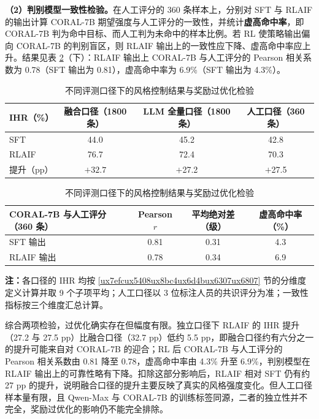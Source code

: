 \documentclass[fontset=fandol,type=master,campus=shenzhen,etitleauto=true]{hithesisbook}
\begin{document}
\textbf{（2）判别模型一致性检验。}在人工评分的 360 条样本上，分别对 SFT 与 RLAIF 的输出计算 CORAL-7B 期望强度与人工评分的一致性，并统计\textbf{虚高命中率}，即 CORAL-7B 判为命中目标、而人工判为未命中的样本比例。若 RL 使策略输出偏向 CORAL-7B 的判别盲区，则 RLAIF 输出上的一致性应下降、虚高命中率应上升。结果见表 \ref{tab:rm-overopt}（下）：RLAIF 输出上 CORAL-7B 与人工评分的 Pearson 相关系数为 0.78（SFT 输出为 0.81），虚高命中率为 6.9\%（SFT 输出为 4.3\%）。

\begin{table}[htbp]
\centering
\caption{不同评测口径下的风格控制结果与奖励过优化检验}
\label{tab:rm-overopt}
\small
\renewcommand{\arraystretch}{1.15}
\begin{tabular}{l c c c}
\toprule
\textbf{IHR（\%）} & \textbf{融合口径（1800 条）} & \textbf{LLM 全量口径（1800 条）} & \textbf{人工口径（360 条）} \\
\midrule
SFT & 44.0 & 45.2 & 42.8 \\
RLAIF & 76.7 & 72.4 & 70.3 \\
提升（pp） & $+32.7$ & $+$27.2 & $+$27.5 \\
\bottomrule
\end{tabular}

\vspace{0.3cm}
\begin{tabular}{l c c c}
\toprule
\textbf{CORAL-7B 与人工评分（360 条）} & \textbf{Pearson $r$} & \textbf{平均绝对差（级）} & \textbf{虚高命中率（\%）} \\
\midrule
SFT 输出 & 0.81 & 0.31 & 4.3 \\
RLAIF 输出 & 0.78 & 0.34 & 6.9 \\
\bottomrule
\end{tabular}

\vspace{0.2cm}
{\small \textbf{注：}各口径的 IHR 均按 \ref{ux7efcux5408ux8bc4ux6d4bux6307ux6807} 节的分维度定义计算并取 9 个子项平均；人工口径以 3 位标注人员的共识评分为准；一致性指标按三个维度汇总计算。}
\end{table}

综合两项检验，过优化确实存在但幅度有限。独立口径下 RLAIF 的 IHR 提升（27.2 与 27.5 pp）比融合口径（32.7 pp）低约 5.5 pp，即融合口径约有六分之一的提升可能来自对 CORAL-7B 的迎合；RL 后 CORAL-7B 与人工评分的 Pearson 相关系数由 0.81 降至 0.78，虚高命中率由 4.3\% 升至 6.9\%，判别模型在 RLAIF 输出上的可靠性略有下降。扣除这部分影响后，RLAIF 相对 SFT 仍有约 27 pp 的提升，说明融合口径的提升主要反映了真实的风格强度变化。但人工口径样本量有限，且 Qwen-Max 与 CORAL-7B 的训练标签同源，二者的独立性并不完全，奖励过优化的影响仍不能完全排除。
\end{document}
